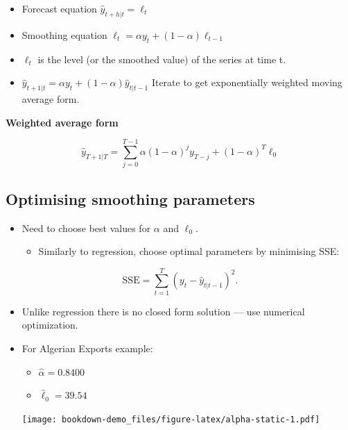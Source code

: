 \documentclass[]{book}
\providecommand{\tightlist}{%
  \setlength{\itemsep}{0pt}\setlength{\parskip}{0pt}}
\begin{document}
\begin{itemize}
\item
  Forecast equation \(\hat{y}_{t+h|t} = \ell_{t}\)
\item
  Smoothing equation \(\ell_{t} = \alpha y_{t} + (1 - \alpha)\ell_{t-1}\)
\item
  \(\ell_t\) is the level (or the smoothed value) of the series at time t.
\item
  \(\hat{y}_{t+1|t} = \alpha y_t + (1-\alpha) \hat{y}_{t|t-1}\)\newline
  Iterate to get exponentially weighted moving average form.
\end{itemize}

\textbf{Weighted average form}

\[\hat{y}_{T+1|T}=\sum_{j=0}^{T-1} \alpha(1-\alpha)^j y_{T-j}+(1-\alpha)^T \ell_{0}\]

\hypertarget{optimising-smoothing-parameters}{%
\subsection{Optimising smoothing parameters}\label{optimising-smoothing-parameters}}

\begin{itemize}
\tightlist
\item
  Need to choose best values for \(\alpha\) and \(\ell_0\).

  \begin{itemize}
  \tightlist
  \item
    Similarly to regression, choose optimal parameters by minimising SSE:
  \end{itemize}
\end{itemize}

\[\text{SSE}=\sum_{t=1}^T(y_t-\hat{y}_{t|t-1})^2.\]

\begin{itemize}
\item
  Unlike regression there is no closed form solution --- use numerical optimization.
\item
  For Algerian Exports example:

  \begin{itemize}
  \tightlist
  \item
    \(\hat\alpha = 0.8400\)
  \item
    \(\hat\ell_0 = 39.54\)
  \end{itemize}

  \texttt{[image: bookdown-demo\_files/figure-latex/alpha-static-1.pdf]}
\end{itemize}
\end{document}
